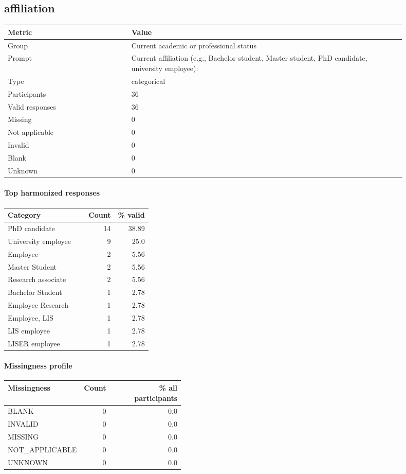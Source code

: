 \subsection*{affiliation}
\begin{tabular}{p{0.28\linewidth}p{0.62\linewidth}}
\toprule
Metric & Value\\
\midrule
Group & Current academic or professional status\\
Prompt & Current affiliation (e.g., Bachelor student, Master student, PhD candidate, university employee):\\
Type & categorical\\
Participants & 36\\
Valid responses & 36\\
Missing & 0\\
Not applicable & 0\\
Invalid & 0\\
Blank & 0\\
Unknown & 0\\
\bottomrule
\end{tabular}

\paragraph{Top harmonized responses}
\begin{tabular}{p{0.56\linewidth}rr}
\toprule
Category & Count & \% valid\\
\midrule
PhD candidate & 14 & 38.89\\
University employee & 9 & 25.0\\
Employee & 2 & 5.56\\
Master Student & 2 & 5.56\\
Research associate & 2 & 5.56\\
Bachelor Student & 1 & 2.78\\
Employee Research & 1 & 2.78\\
Employee, LIS & 1 & 2.78\\
LIS employee & 1 & 2.78\\
LISER employee & 1 & 2.78\\
\bottomrule
\end{tabular}

\paragraph{Missingness profile}
\begin{tabular}{p{0.40\linewidth}rr}
\toprule
Missingness & Count & \% all participants\\
\midrule
BLANK & 0 & 0.0\\
INVALID & 0 & 0.0\\
MISSING & 0 & 0.0\\
NOT\_APPLICABLE & 0 & 0.0\\
UNKNOWN & 0 & 0.0\\
\bottomrule
\end{tabular}

